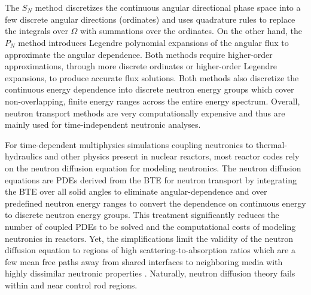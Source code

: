 The $S_N$ method discretizes the continuous angular directional phase space into a few discrete
angular directions (ordinates) and uses quadrature rules to replace the integrals over
$\hat{\Omega}$ with summations over the ordinates. On the other hand, the $P_N$ method introduces
Legendre polynomial expansions of the angular flux to approximate the angular dependence. Both
methods require higher-order approximations, through more discrete ordinates or higher-order
Legendre expansions, to produce accurate flux solutions. Both methods also discretize the
continuous energy dependence into discrete neutron energy groups which cover non-overlapping,
finite energy ranges across the entire energy spectrum. Overall, neutron transport methods are very
computationally expensive and thus are mainly used for time-independent neutronic analyses.

For time-dependent multiphysics simulations coupling neutronics to
thermal-hydraulics and other physics present in nuclear reactors, most reactor
codes rely on the neutron diffusion equation for modeling neutronics.
The neutron diffusion equations are \glspl{PDE} derived from the \gls{BTE} for
neutron transport by integrating the \gls{BTE}
over all solid angles to eliminate angular-dependence and over predefined
neutron energy ranges to convert the dependence on continuous energy to
discrete neutron energy groups. This treatment significantly reduces the number
of coupled \glspl{PDE} to be solved and the computational costs of modeling
neutronics in reactors.
Yet, the simplifications limit the validity of the neutron diffusion
equation to regions of high scattering-to-absorption ratios which are a few
mean free paths away from shared interfaces to neighboring media with highly
dissimilar neutronic properties \cite{shultis_chapter_2016}. Naturally, neutron
diffusion theory fails within and near control rod regions.

